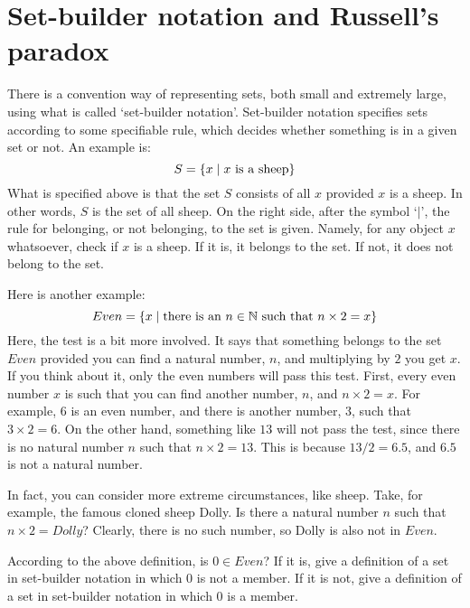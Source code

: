 \section{Set-builder notation and Russell's paradox}

There is a convention way of representing sets, both small and extremely large, using what is called `set-builder notation'. Set-builder notation specifies sets according to some specifiable rule, which decides whether something is in a given set or not. An example is:
\[
S=\{x \mid x\text{ is a sheep}\}
\]
What is specified above is that the set $S$ consists of all $x$ provided $x$ is a sheep. In other words, $S$ is the set of all sheep. On the right side, after the symbol `$\mid$', the rule for belonging, or not belonging, to the set is given. Namely, for any object $x$ whatsoever, check if $x$ is a sheep. If it is, it belongs to the set. If not, it does not belong to the set. 

Here is another example: 
\[
Even=\{x\mid \text{there is an }n \in \mathbb{N}\text{ such that }n \times 2=x\}
\]
Here, the test is a bit more involved. It says that something belongs to the set $Even$ provided you can find a natural number, $n$, and multiplying by $2$ you get $x$. If you think about it, only the even numbers will pass this test. First, every even number $x$ is such that you can find another number, $n$, and $n\times 2=x$. For example, $6$ is an even number, and there is another number, $3$, such that $3 \times 2=6$. On the other hand, something like $13$ will not pass the test, since there is no natural number $n$ such that $n\times 2=13$. This is because $13/2=6.5$, and $6.5$ is not a natural number. 


In fact, you can consider more extreme circumstances, like sheep. Take, for example, the famous cloned sheep Dolly. Is there a natural number $n$ such that $n \times 2=Dolly$? Clearly, there is no such number, so Dolly is also not in $Even$. 

\begin{exc}
	According to the above definition, is $0 \in Even$? If it is, give a definition of a set in set-builder notation in which $0$ is not a member. If it is not, give a definition of a set in set-builder notation in which $0$ is a member. 
\end{exc} 

